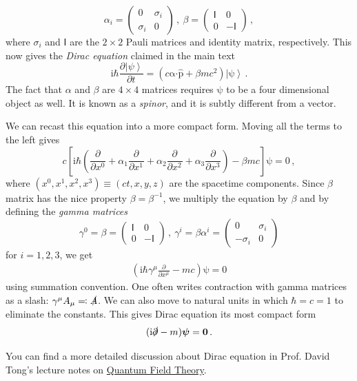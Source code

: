 \documentclass{article}
\theoremstyle{plain}\theoremheaderfont{\normalfont\itshape}\theorembodyfont{\rmfamily}\theoremseparator{.}\newtheorem*{rem}{Remark}\newtheorem*{ex}{Example}\newtheorem*{proof}{Proof}\newtheorem*{altp}{Alternative proof}
\theoremstyle{plain}\theoremheaderfont{\normalfont\bfseries}\theorembodyfont{\rmfamily}\theoremseparator{.}\newtheorem{thm}{Theorem}[section]\newtheorem{lem}[thm]{Lemma}\newtheorem{prop}[thm]{Proposition}\newtheorem*{cor}{Corollary}\newtheorem{defn}[thm]{Definition}\newtheorem{clm}[thm]{Claim}\newtheorem{clminproof}{Claim}
\theoremstyle{break}\theoremheaderfont{\normalfont\itshape}\theorembodyfont{\rmfamily}\theoremseparator{.\medskip}\newtheorem*{proofskip}{Proof}\newtheorem*{exs}{Examples}\newtheorem*{rems}{Remarks}
\theoremstyle{break}\theoremheaderfont{\normalfont\bfseries}\theorembodyfont{\rmfamily}\theoremseparator{.\medskip}\newtheorem{lemskip}[thm]{Lemma}\newtheorem{defnskip}[thm]{Definition}\newtheorem{propskip}[thm]{Proposition}\newtheorem{thmskip}[thm]{Theorem}
\numberwithin{equation}{section}
\newcommand{\ii}{\mathrm{i}}
\newcommand{\pdv}[3][]{\frac{\partial^{#1} #2}{{\partial #3}^{#1}}}
\newcommand{\ket}[1]{\left| #1 \right\rangle}
\newcommand{\vb}[1]{\bm{\mathrm{#1}}}
\newcommand{\vdot}{\bm{\cdot}}
\begin{document}
    \begin{equation}
        \alpha_i=\begin{pmatrix}
            0 & \sigma_i \\
            \sigma_i & 0
        \end{pmatrix}\,,\ \beta=\begin{pmatrix}
            \mathsf{I} & 0 \\
            0 & -\mathsf{I}
        \end{pmatrix}\,,
    \end{equation}
    where \(\sigma_i\) and \(\mathsf{I}\) are the \(2\times 2\) Pauli matrices and identity matrix, respectively. This now gives the \textit{Dirac equation} claimed in the main text
    \begin{equation}
        \ii\hbar\pdv{\ket{\psi}}{t}=(c\vb{\alpha}\vdot\hat{\vb{p}}+\beta mc^2)\ket{\vb{\psi}}\,.
    \end{equation}
    The fact that \(\alpha\) and \(\beta\) are \(4\times 4\) matrices requires \(\vb{\psi}\) to be a four dimensional object as well. It is known as a \textit{spinor}, and it is subtly different from a vector.

    We can recast this equation into a more compact form. Moving all the terms to the left gives
    \begin{equation}
        c\left[\ii\hbar\left(\pdv{}{x^0}+\alpha_1\pdv{}{x^1}+\alpha_2\pdv{}{x^2}+\alpha_3\pdv{}{x^3}\right) - \beta mc\right]\vb{\psi}=\vb{0}\,,
    \end{equation}
    where \((x^0,x^1,x^2,x^3)\equiv(ct,x,y,z)\) are the spacetime components. Since \(\beta\) matrix has the nice property \(\beta=\beta^{-1}\), we multiply the equation by \(\beta\) and by defining the \textit{gamma matrices}
    \begin{equation}
        \gamma^0=\beta=\begin{pmatrix}
            \mathsf{I} & 0 \\
            0 & -\mathsf{I}
        \end{pmatrix}\,,\ \gamma^i = \beta\alpha^i = \begin{pmatrix}
            0 & \sigma_i \\
            -\sigma_i & 0
        \end{pmatrix}
    \end{equation}
    for \(i=1,2,3\), we get
    \begin{align}
        \left(\ii\hbar\gamma^\mu\pdv{}{x^\mu} - mc\right)\vb{\psi}=\vb{0}
    \end{align}
    using summation convention. One often writes contraction with gamma matrices as a slash: \(\gamma^\mu A_\mu\eqqcolon\slashed{A}\). We can also move to natural units in which \(\hbar=c=1\) to eliminate the constants. This gives Dirac equation its most compact form
    \begin{equation}
        (\ii\slashed{\partial}-m)\vb{\psi}=\vb{0}\,.
    \end{equation}
    

    You can find a more detailed discussion about Dirac equation in Prof. David Tong's lecture notes on \href{https://www.damtp.cam.ac.uk/user/tong/qft.html}{\color{blue}Quantum Field Theory}.

    
\end{document}
